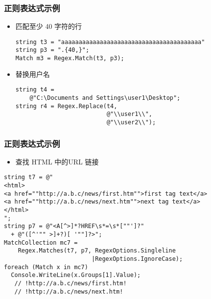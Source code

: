 \begin{frame}[fragile]
\frametitle{正则表达式示例}
\begin{itemize}
\item 匹配至少 40 字符的行
\begin{lstlisting}
string t3 = "aaaaaaaaaaaaaaaaaaaaaaaaaaaaaaaaaaaaaaaa"
string p3 = ".{40,}";
Match m3 = Regex.Match(t3, p3);
\end{lstlisting}
\item 替换用户名
\begin{lstlisting}
string t4 =
    @"C:\Documents and Settings\user1\Desktop";
string r4 = Regex.Replace(t4,
                          @"\\user1\\",
                          @"\\user2\\");
\end{lstlisting}
\end{itemize}
\end{frame}


\begin{frame}[fragile]
\frametitle{正则表达式示例}
\begin{itemize}
\item 查找 HTML 中的URL 链接
\end{itemize}
\begin{lstlisting}[escapeinside=!!]
string t7 = @"
<html>
<a href=""http://a.b.c/news/first.htm"">first tag text</a>
<a href=""http://a.b.c/news/next.htm"">next tag text</a>
</html>
";
string p7 = @"<A[^>]*?HREF\s*=\s*[""']?"
  + @"([^'"" >]+?)[ '""]?>";
MatchCollection mc7 = 
    Regex.Matches(t7, p7, RegexOptions.Singleline
                         |RegexOptions.IgnoreCase);
foreach (Match x in mc7)
  Console.WriteLine(x.Groups[1].Value);
   // !http://a.b.c/news/first.htm!
   // !http://a.b.c/news/next.htm!
\end{lstlisting}
\end{frame}

